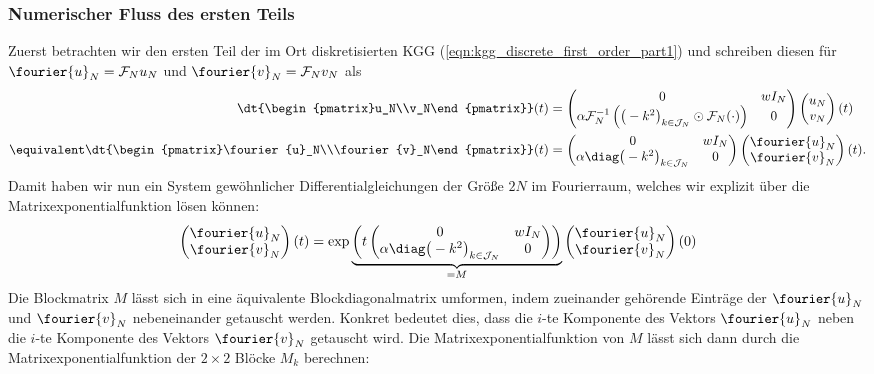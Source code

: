 \subsubsection*{Numerischer Fluss des ersten Teils}
Zuerst betrachten wir den ersten Teil der im Ort diskretisierten KGG (\ref{eqn:kgg_discrete_first_order_part1}) und schreiben diesen für $\fourier{u}_N=\mathcal{F}_Nu_N$ und $\fourier{v}_N=\mathcal{F}_Nv_N$ als
\begin{align*}
\dt{\begin{pmatrix}u_N\\v_N\end{pmatrix}}(t)&=
\begin{pmatrix}0 & wI_N\\ \alpha\mathcal{F}_N^{-1}\left(\big(-k^2\big)_{k\in\mathcal{J}_N}\odot\mathcal{F}_N (\cdot )\right) & 0\end{pmatrix}
\begin{pmatrix}u_N\\v_N\end{pmatrix}(t)\\
\equivalent 
\dt{\begin{pmatrix}\fourier{u}_N\\\fourier{v}_N\end{pmatrix}}(t)&=
\begin{pmatrix}0 & wI_N\\ \alpha\diag\big(-k^2\big)_{k\in\mathcal{J}_N} & 0\end{pmatrix}
\begin{pmatrix}\fourier{u}_N\\\fourier{v}_N\end{pmatrix}(t).
\end{align*}
Damit haben wir nun ein System gewöhnlicher Differentialgleichungen der Größe $2N$ im Fourierraum, welches wir explizit über die Matrixexponentialfunktion lösen können:
\[\begin{pmatrix}\fourier{u}_N\\\fourier{v}_N\end{pmatrix}(t)=\exp\underbrace{\left(t\begin{pmatrix}0 & wI_N\\ \alpha\diag\big(-k^2\big)_{k\in\mathcal{J}_N} & 0\end{pmatrix}\right)}_{=M}
\begin{pmatrix}\fourier{u}_N\\\fourier{v}_N\end{pmatrix}(0)\]
Die Blockmatrix $M$ lässt sich in eine äquivalente Blockdiagonalmatrix umformen, indem zueinander gehörende Einträge der $\fourier{u}_N$ und $\fourier{v}_N$ nebeneinander getauscht werden. Konkret bedeutet dies, dass die $i$-te Komponente des Vektors $\fourier{u}_N$ neben die $i$-te Komponente des Vektors $\fourier{v}_N$ getauscht wird. Die Matrixexponentialfunktion von $M$ lässt sich dann durch die Matrixexponentialfunktion der $2\times 2$ Blöcke $M_k$ berechnen:
